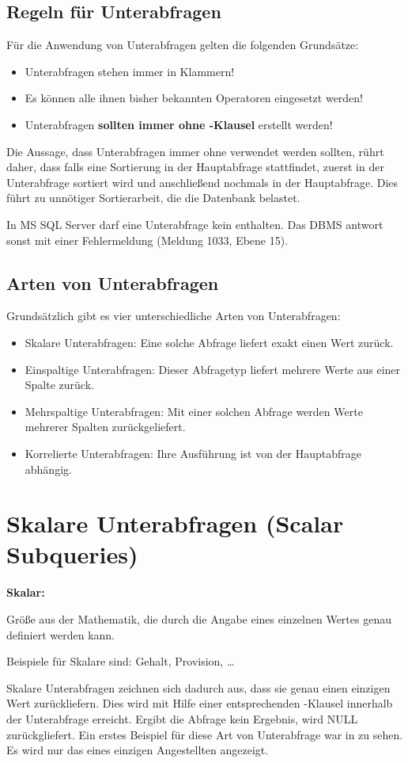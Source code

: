 \subsection{Regeln für Unterabfragen}
Für die Anwendung von Unterabfragen gelten die folgenden Grundsätze:
\begin{itemize}
    \item Unterabfragen stehen immer in Klammern!
    \item Es können alle ihnen bisher bekannten Operatoren eingesetzt werden!
    \item Unterabfragen \textbf{sollten immer ohne \ORDERBY-Klausel} erstellt werden!
\end{itemize}
Die Aussage, dass Unterabfragen immer ohne \ORDERBY{} verwendet werden sollten, rührt daher, dass falls eine Sortierung in der Hauptabfrage stattfindet, zuerst in der Unterabfrage sortiert wird und anschließend nochmals in der Hauptabfrage. Dies führt zu unnötiger Sortierarbeit, die die Datenbank belastet.

\begin{merke}
    In MS SQL Server darf eine Unterabfrage kein \ORDERBY{} enthalten. Das DBMS antwort sonst mit einer Fehlermeldung (Meldung 1033, Ebene 15).
\end{merke}
\subsection{Arten von Unterabfragen}
Grundsätzlich gibt es vier unterschiedliche Arten von Unterabfragen:
\begin{itemize}
    \item Skalare Unterabfragen: Eine solche Abfrage liefert exakt einen Wert zurück.
    \item Einspaltige Unterabfragen: Dieser Abfragetyp liefert mehrere Werte aus einer Spalte zurück.
    \item Mehrspaltige Unterabfragen: Mit einer solchen Abfrage werden Werte mehrerer Spalten zurückgeliefert.
    \item Korrelierte Unterabfragen: Ihre Ausführung ist von der Hauptabfrage abhängig.
\end{itemize}
\clearpage
\section{Skalare Unterabfragen (Scalar Subqueries)}
\begin{merke}
    \textbf{Skalar:}
    \vspace{1em}

    Größe aus der Mathematik, die durch die Angabe eines einzelnen Wertes genau definiert werden kann.
    \vspace{1em}

    Beispiele für Skalare sind: Gehalt, Provision, \dots
\end{merke}
Skalare Unterabfragen zeichnen sich dadurch aus, dass sie genau einen einzigen Wert zurückliefern.   Dies wird mit Hilfe einer entsprechenden \WHERE-Klausel innerhalb der Unterabfrage erreicht. Ergibt die Abfrage kein Ergebnis, wird NULL zurückgliefert. Ein erstes Beispiel für diese Art von Unterabfrage war in  zu sehen. Es wird nur das  eines einzigen Angestellten angezeigt.

